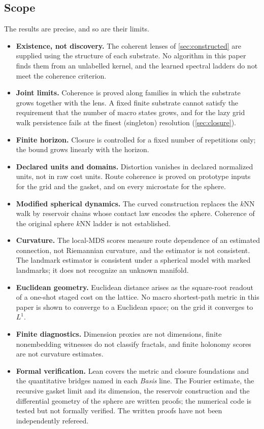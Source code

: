 \documentclass[11pt]{article}
\begin{document}
\subsection{Scope}

The results are precise, and so are their limits.
\begin{itemize}[leftmargin=*]
\item \textbf{Existence, not discovery.} The coherent lenses of \cref{sec:constructed} are supplied using the structure of each substrate. No algorithm in this paper finds them from an unlabelled kernel, and the learned spectral ladders do not meet the coherence criterion.
\item \textbf{Joint limits.} Coherence is proved along families in which the substrate grows together with the lens. A fixed finite substrate cannot satisfy the requirement that the number of macro states grows, and for the lazy grid walk persistence fails at the finest (singleton) resolution (\cref{sec:closure}).
\item \textbf{Finite horizon.} Closure is controlled for a fixed number of repetitions only; the bound grows linearly with the horizon.
\item \textbf{Declared units and domains.} Distortion vanishes in declared normalized units, not in raw cost units. Route coherence is proved on prototype inputs for the grid and the gasket, and on every microstate for the sphere.
\item \textbf{Modified spherical dynamics.} The curved construction replaces the $k$NN walk by reservoir chains whose contact law encodes the sphere. Coherence of the original sphere $k$NN ladder is not established.
\item \textbf{Curvature.} The local-MDS scores measure route dependence of an estimated connection, not Riemannian curvature, and the estimator is not consistent. The landmark estimator is consistent under a spherical model with marked landmarks; it does not recognize an unknown manifold.
\item \textbf{Euclidean geometry.} Euclidean distance arises as the square-root readout of a one-shot staged cost on the lattice. No macro shortest-path metric in this paper is shown to converge to a Euclidean space; on the grid it converges to $L^1$.
\item \textbf{Finite diagnostics.} Dimension proxies are not dimensions, finite nonembedding witnesses do not classify fractals, and finite holonomy scores are not curvature estimates.
\item \textbf{Formal verification.} Lean covers the metric and closure foundations and the quantitative bridges named in each \emph{Basis} line. The Fourier estimate, the recursive gasket limit and its dimension, the reservoir construction and the differential geometry of the sphere are written proofs; the numerical code is tested but not formally verified. The written proofs have not been independently refereed.
\end{itemize}
\end{document}
